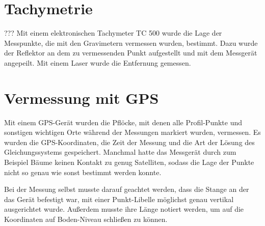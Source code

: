 \section{Tachymetrie}???
Mit einem elektronischen Tachymeter TC 500 wurde die Lage der Messpunkte, die mit den Gravimetern vermessen wurden, bestimmt. Dazu wurde der Reflektor an dem zu vermessenden Punkt aufgestellt und mit dem Messgerät angepeilt. Mit einem Laser 
wurde die Entfernung gemessen.

\section{Vermessung mit GPS}

Mit einem GPS-Gerät wurden die Pflöcke, mit denen alle Profil-Punkte und sonstigen wichtigen Orte während der Messungen markiert wurden, vermessen. Es wurden die GPS-Koordinaten, die Zeit der Messung und die Art der Lösung des Gleichungssystems gespeichert. Manchmal hatte das Messgerät durch zum Beispiel Bäume keinen Kontakt zu genug Satelliten, sodass die Lage der Punkte nicht so genau wie sonst bestimmt werden konnte.

Bei der Messung selbst musste darauf geachtet werden, dass die Stange an der das Gerät befestigt war, mit einer Punkt-Libelle möglichst genau vertikal ausgerichtet wurde. Außerdem musste ihre Länge notiert werden, um auf die Koordinaten auf Boden-Niveau schließen zu können.